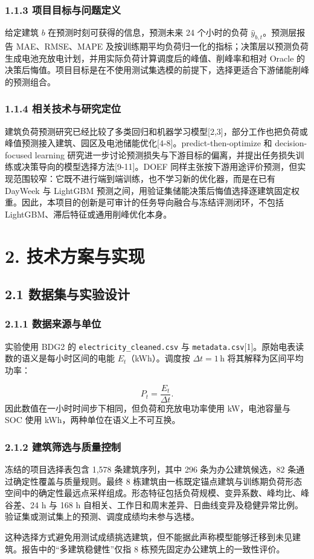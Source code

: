 \documentclass[12pt,a4paper]{article}
\begin{document}
\subsubsection{1.1.3 项目目标与问题定义}
给定建筑 \(b\) 在预测时刻可获得的信息，预测未来 24 个小时的负荷 \(\hat{y}_{b,t}\)。预测层报告 MAE、RMSE、MAPE 及按训练期平均负荷归一化的指标；决策层以预测负荷生成电池充放电计划，并用实际负荷计算调度后的峰值、削峰率和相对 Oracle 的决策后悔值。项目目标是在不使用测试集选模的前提下，选择更适合下游储能削峰的预测组合。\par
\subsubsection{1.1.4 相关技术与研究定位}
建筑负荷预测研究已经比较了多类回归和机器学习模型[2,3]，部分工作也把负荷或峰值预测接入建筑、园区及电池储能优化[4-8]。predict-then-optimize 和 decision-focused learning 研究进一步讨论预测损失与下游目标的偏离，并提出任务损失训练或决策导向的模型选择方法[9-11]。DOEF 同样主张按下游用途评价预测，但实现范围较窄：它既不进行端到端训练，也不学习新的优化器，而是在已有 DayWeek 与 LightGBM 预测之间，用验证集储能决策后悔值选择逐建筑固定权重。因此，本项目的创新是可审计的任务导向融合与冻结评测闭环，不包括 LightGBM、滞后特征或通用削峰优化本身。\par
\section{2. 技术方案与实现}
\subsection{2.1 数据集与实验设计}
\subsubsection{2.1.1 数据来源与单位}
实验使用 BDG2 的 \nolinkurl{electricity_cleaned.csv} 与 \nolinkurl{metadata.csv}[1]。原始电表读数的语义是每小时区间的电能 \(E_t\)（kWh）。调度按 \(\Delta t=1\,\text{h}\) 将其解释为区间平均功率：\par
\[
P_t = \frac{E_t}{\Delta t}.
\]
因此数值在一小时时间步下相同，但负荷和充放电功率使用 kW，电池容量与 SOC 使用 kWh，两种单位在语义上不可互换。\par
\subsubsection{2.1.2 建筑筛选与质量控制}
冻结的项目选择表包含 1,578 条建筑序列，其中 296 条为办公建筑候选，82 条通过确定性覆盖与质量规则。最终 8 栋建筑由一栋既定锚点建筑与训练期负荷形态空间中的确定性最远点采样组成。形态特征包括负荷规模、变异系数、峰均比、峰谷差、24 h 与 168 h 自相关、工作日和周末差异、日曲线变异及稳健异常比例。验证集或测试集上的预测、调度成绩均未参与选楼。\par
这种选择方式避免用测试成绩挑选建筑，但不能据此声称模型能够迁移到未见建筑。报告中的“多建筑稳健性”仅指 8 栋预先固定办公建筑上的一致性评价。\par
\end{document}
